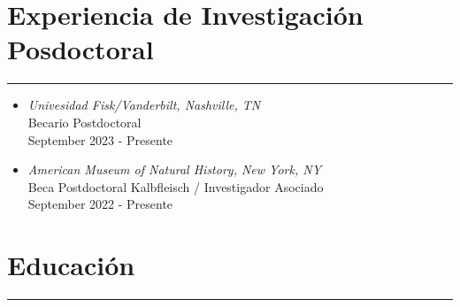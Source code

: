 \documentclass[letterpaper,10pt]{article}
\begin{document}
\section*{Experiencia de Investigaci\'on Posdoctoral}

\hrule
\vspace{.3 cm}
\begin{itemize}[label=$\blacktriangleright$]


 \item \emph{Univesidad Fisk/Vanderbilt, Nashville, TN}\\
 Becario Postdoctoral  \\
 September 2023 - Presente



 \item \emph{American Museum of Natural History, New York, NY}\\
 Beca Postdoctoral Kalbfleisch   / Investigador Asociado \\
  September 2022 - Presente\\
 

 

\end{itemize}



\section*{Educaci\'on}

\hrule
\vspace{.3 cm}
\end{document}
